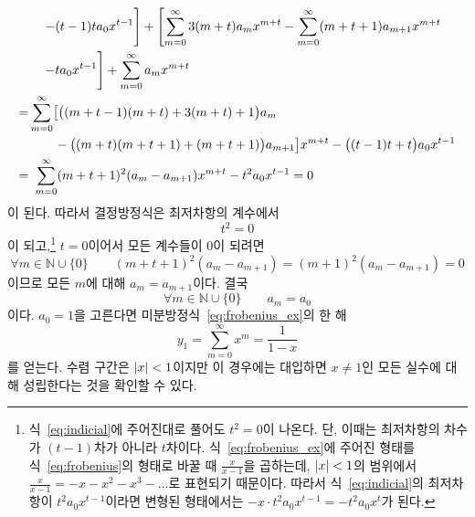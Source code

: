 \documentclass[../engineering_mathematics_lecture_note.tex]{subfiles}
\begin{document}
\begin{example}
\begin{align*}
         &\quad \left.- (t - 1)t a_0 x^{t - 1}\vphantom{\sum^\infty_0}\right] + \left[\sum^{\infty}_{m = 0} 3 (m + t) a_m x^{m + t} - \sum^{\infty}_{m = 0} (m + t + 1) a_{m + 1} x^{m + t} \right.\\
         &\quad \left.- t a_0 x^{t - 1}\vphantom{\sum^\infty_0}\right] + \sum^{\infty}_{m = 0} a_m x^{m + t}\\
        =& \sum^{\infty}_{m = 0} \bigl[\bigl( (m + t - 1)(m + t) + 3(m + t) + 1 \bigr)a_m\\
          &\qquad - \bigl( (m + t)(m + t + 1) + (m + t + 1) \bigr) a_{m + 1} \bigr] x^{m + t} - \bigl( (t - 1)t + t \bigr) a_0 x^{t - 1}\\
            =&\ \sum^{\infty}_{m = 0} (m + t + 1)^2 (a_m - a_{m + 1})x^{m + t} - t^2 a_0 x^{t - 1} = 0
    \end{align*}
    이 된다.
    따라서 결정방정식은 최저차항의 계수에서
    \begin{equation} \label{eq:frobenius_ex_indicial}
        t^2 = 0
    \end{equation}
    이 되고,\footnote{식~\ref{eq:indicial}에 주어진대로 풀어도 $t^2 = 0$이 나온다. 단, 이때는 최저차항의 차수가 $(t - 1)$차가 아니라 $t$차이다. 식~\ref{eq:frobenius_ex}에 주어진 형태를 식~\ref{eq:frobenius}의 형태로 바꿀 때 $\frac{x}{x - 1}$을 곱하는데, $\abs{x} < 1$의 범위에서 $\frac{x}{x - 1} = -x -x^2 - x^3 - \dots$로 표현되기 때문이다. 따라서 식~\ref{eq:indicial}의 최저차항이 $t^2 a_0 x^{t - 1}$이라면 변형된 형태에서는 $-x \cdot t^2 a_0 x^{t - 1} = - t^2 a_0 x^t$가 된다.} $t = 0$이어서 모든 계수들이 0이 되려면
    \begin{equation*}
        \forall m \in \mathbb N \cup \{0\} \qquad (m + t + 1)^2 (a_m - a_{m + 1}) = (m + 1)^2 (a_m - a_{m + 1}) = 0
    \end{equation*}
    이므로 모든 $m$에 대해 $a_m = a_{m + 1}$이다.
    결국
    \begin{equation*}
        \forall m \in \mathbb N \cup \{0\} \qquad a_m = a_0
    \end{equation*}
    이다.
    $a_0 = 1$을 고른다면 미분방정식~\ref{eq:frobenius_ex}의 한 해
    \begin{equation*}
        y_1 = \sum^{\infty}_{m = 0} x^m = \frac{1}{1 - x}
    \end{equation*}
    를 얻는다.
    수렴 구간은 $\abs{x} < 1$이지만 이 경우에는 대입하면 $x \neq 1$인 모든 실수에 대해 성립한다는 것을 확인할 수 있다.


\end{example}
\end{document}

